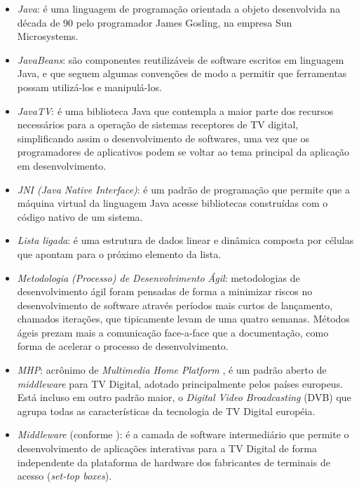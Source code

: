 \begin{itemize}
  \item \emph{Java}: é uma linguagem de programação orientada a objeto desenvolvida na década de 90 pelo programador James Gosling, na empresa Sun Microsystems.

  \item \emph{JavaBeans}: são componentes reutilizáveis de software escritos em linguagem Java, e que seguem algumas convenções de modo a permitir que ferramentas possam utilizá-los e manipulá-los.

  \item \emph{JavaTV}: é uma biblioteca Java que contempla a maior parte dos recursos necessários para a operação de sistemas receptores de TV digital, simplificando assim o desenvolvimento de softwares, uma vez que os programadores de aplicativos podem se voltar ao tema principal da aplicação em desenvolvimento.

  \item \emph{JNI (Java Native Interface)}: é um padrão de programação que permite que a máquina virtual da linguagem Java acesse bibliotecas construídas com o código nativo de um sistema.

  \item \emph{Lista ligada}: é uma estrutura de dados linear e dinâmica composta por células que apontam para o próximo elemento da lista.

  \item \emph{Metodologia (Processo) de Desenvolvimento Ágil}: metodologias de desenvolvimento ágil foram pensadas de forma a minimizar riscos no desenvolvimento de software através períodos mais curtos de lançamento, chamados iterações, que tipicamente levam de uma quatro semanas. Métodos ágeis prezam mais a comunicação face-a-face que a documentação, como forma de acelerar o processo de desenvolvimento.

  \item \emph{MHP}: acrônimo de \emph{Multimedia Home Platform} \cite{mhp}, é um padrão aberto de \emph{middleware} para TV Digital, adotado principalmente pelos países europeus. Está incluso em outro padrão maior, o \emph{Digital Video Broadcasting} (DVB) \cite{dvb} que agrupa todas as características da tecnologia de TV Digital européia.

  \item \emph{Middleware} (conforme \cite{ginga}): é a camada de software intermediário que permite o desenvolvimento de aplicações interativas para a TV Digital de forma independente da plataforma de hardware dos fabricantes de terminais de acesso (\emph{set-top boxes}).


\end{itemize}
